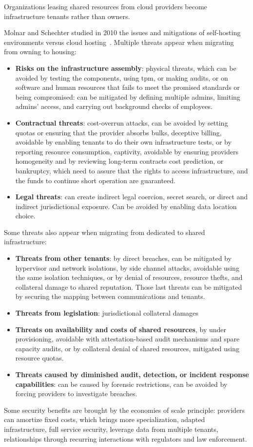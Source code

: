 Organizations leasing shared resources from cloud providers become infrastructure tenants rather than owners.

Molnar and Schechter studied in 2010 the issues and mitigations of self-hosting environments versus \gls{cloud} hosting~\cite{molnar_self_2010}. Multiple threats appear when migrating from owning to housing:
\begin{itemize}
	\item \textbf{Risks on the infrastructure assembly}: physical threats, which can be avoided by testing the components, using \gls{tpm}, or making audits, or on software and human resources that fails to meet the promised standards or being compromised: can be mitigated by defining multiple admins, limiting admins' access, and carrying out background checks of employees.
	\item \textbf{Contractual threats}: cost-overrun attacks, can be avoided by setting quotas or ensuring that the provider absorbs bulks, deceptive billing, avoidable by enabling tenants to do their own infrastructure tests, or by reporting resource consumption, captivity, avoidable by ensuring providers homogeneity and by reviewing long-term contracts cost prediction, or bankruptcy, which need to assure that the rights to access infrastructure, and the funds to continue short operation are guaranteed.
	\item \textbf{Legal threats}: can create indirect legal coercion, secret search, or direct and indirect jurisdictional exposure. Can be avoided by enabling data location choice.
\end{itemize} %
Some threats also appear when migrating from dedicated to shared infrastructure: 
\begin{itemize}
	\item \textbf{Threats from other tenants}: by direct breaches, can be mitigated by hypervisor and network isolations, by side channel attacks, avoidable using the same isolation techniques, or by denial of resources, resource thefts, and collateral damage to shared reputation. Those last threats can be mitigated by securing the mapping between communications and tenants.
	\item \textbf{Threats from legislation}: jurisdictional collateral damages
	\item \textbf{Threats on availability and costs of shared resources}, by under provisioning, avoidable with attestation-based audit mechanisms and spare capacity audits, or by collateral denial of shared resources, mitigated using resource quotas.
	\item \textbf{Threats caused by diminished audit, detection, or incident response capabilities}: can be caused by forensic restrictions, can be avoided by forcing providers to investigate breaches.
\end{itemize} %
Some security benefits are brought by the economies of scale principle: providers can amortize fixed costs, which brings more specialization, adapted infrastructure, full service security, leverage data from multiple tenants, relationships through recurring interactions with regulators and law enforcement. %

